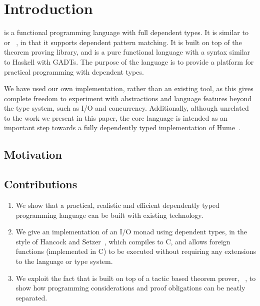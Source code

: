 \section{Introduction}

\Idris{} is a functional programming language with full dependent
types. It is similar to \Epigram~\cite{view-left} or
\Agda{}~\cite{ulf-thesis}, in that it supports dependent pattern
matching. It is built on top of the \Ivor{}~\cite{ivor} theorem
proving library, and is a pure functional language with a syntax
similar to Haskell with GADTs.  The purpose of the language is to
provide a platform for practical programming with dependent types.

We have used our own implementation, rather than an
existing tool, as this gives complete freedom to experiment with
abstractions and language features beyond the type system, such as I/O
and concurrency. Additionally, although unrelated to the work we
present in this paper, the core language is intended as an important
step towards a fully dependently typed implementation of
Hume~\cite{Hume-GPCE}.

\subsection{Motivation}

\subsection{Contributions}

\begin{enumerate}
\item We show that a practical, realistic and efficient dependently
  typed programming language can be built with existing technology.
\item We give an implementation of an I/O monad using dependent types,
  in the style of Hancock and Setzer~\cite{hancock-interactive}, which
  compiles to C, and allows foreign functions (implemented in C) to be
  executed without requiring any extensions to the language or type
  system.
\item We exploit the fact that \Idris{} is built on top of a tactic
  based theorem prover, \Ivor{}~\cite{ivor}, to show how programming
  considerations and proof obligations can be neatly separated.
\end{enumerate}

